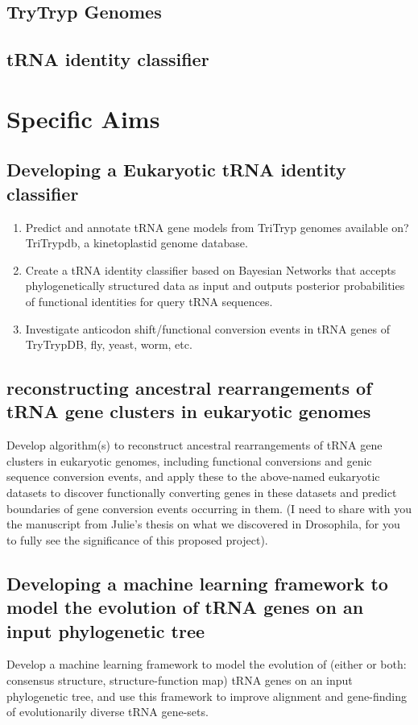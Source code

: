 \documentclass[
10pt, %
a4paper, %
oneside, %
headinclude,footinclude, %
BCOR5mm, %
]{scrartcl}
\begin{document}
\subsection{TryTryp Genomes}	
\subsection{tRNA identity classifier}

\section{Specific Aims}
\subsection{Developing a Eukaryotic tRNA identity classifier}
 
\begin{enumerate}[noitemsep] %
\item Predict and annotate tRNA gene models from TriTryp genomes available on? TriTrypdb, a kinetoplastid genome database. 
\item Create a tRNA identity classifier based on Bayesian Networks that accepts phylogenetically structured data as input and outputs posterior probabilities of functional identities for query tRNA sequences.
\item Investigate anticodon shift/functional conversion events in tRNA genes of TryTrypDB, fly, yeast, worm, etc. 

\end{enumerate} 
\subsection{reconstructing ancestral rearrangements of tRNA gene clusters in eukaryotic genomes}
Develop algorithm(s) to reconstruct ancestral rearrangements of tRNA gene clusters in eukaryotic genomes, including functional conversions and genic sequence conversion events, and apply these to the above-named eukaryotic datasets to discover functionally converting genes in these datasets and predict boundaries of gene conversion events occurring in them. (I need to share with you the manuscript from Julie’s thesis on what we discovered in Drosophila, for you to fully see the significance of this proposed project). 
\subsection{Developing a machine learning framework to model the evolution of tRNA genes on an input phylogenetic tree}
Develop a machine learning framework to model the evolution of (either or both: {consensus structure, structure-function map}) tRNA genes on an input phylogenetic tree, and use this framework to improve alignment and gene-finding of evolutionarily diverse tRNA gene-sets.
\end{document}
